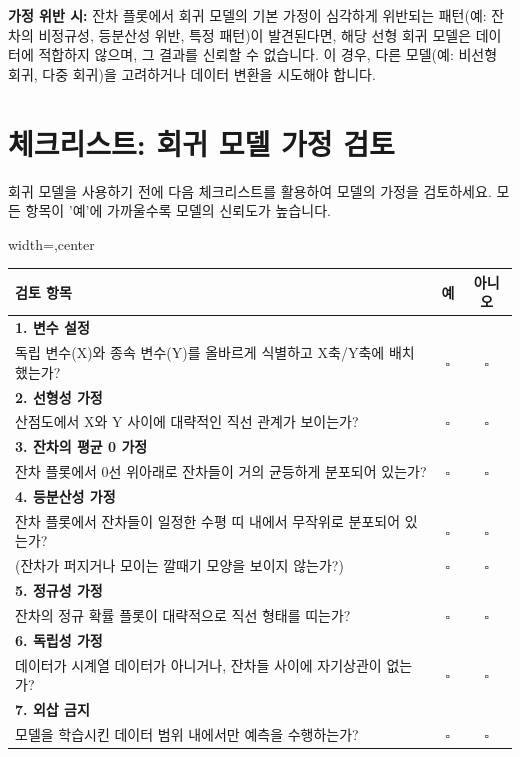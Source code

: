 \documentclass[11pt,a4paper]{article}
\begin{document}
\begin{cautionbox}
\textbf{가정 위반 시:}
잔차 플롯에서 회귀 모델의 기본 가정이 심각하게 위반되는 패턴(예: 잔차의 비정규성, 등분산성 위반, 특정 패턴)이 발견된다면, 해당 선형 회귀 모델은 데이터에 적합하지 않으며, 그 결과를 신뢰할 수 없습니다. 이 경우, 다른 모델(예: 비선형 회귀, 다중 회귀)을 고려하거나 데이터 변환을 시도해야 합니다.
\end{cautionbox}

\newpage
\section*{체크리스트: 회귀 모델 가정 검토}
회귀 모델을 사용하기 전에 다음 체크리스트를 활용하여 모델의 가정을 검토하세요. 모든 항목이 '예'에 가까울수록 모델의 신뢰도가 높습니다.

\begin{adjustbox}{width=\textwidth,center}
\begin{tabular}{p{}cc}
\toprule
\textbf{검토 항목} & \textbf{예} & \textbf{아니오} \\
\midrule
\textbf{1. 변수 설정} & & \\
\quad 독립 변수(X)와 종속 변수(Y)를 올바르게 식별하고 X축/Y축에 배치했는가? & $\square$ & $\square$ \\
\textbf{2. 선형성 가정} & & \\
\quad 산점도에서 X와 Y 사이에 대략적인 직선 관계가 보이는가? & $\square$ & $\square$ \\
\textbf{3. 잔차의 평균 0 가정} & & \\
\quad 잔차 플롯에서 0선 위아래로 잔차들이 거의 균등하게 분포되어 있는가? & $\square$ & $\square$ \\
\textbf{4. 등분산성 가정} & & \\
\quad 잔차 플롯에서 잔차들이 일정한 수평 띠 내에서 무작위로 분포되어 있는가? & $\square$ & $\square$ \\
\quad (잔차가 퍼지거나 모이는 깔때기 모양을 보이지 않는가?) & $\square$ & $\square$ \\
\textbf{5. 정규성 가정} & & \\
\quad 잔차의 정규 확률 플롯이 대략적으로 직선 형태를 띠는가? & $\square$ & $\square$ \\
\textbf{6. 독립성 가정} & & \\
\quad 데이터가 시계열 데이터가 아니거나, 잔차들 사이에 자기상관이 없는가? & $\square$ & $\square$ \\
\textbf{7. 외삽 금지} & & \\
\quad 모델을 학습시킨 데이터 범위 내에서만 예측을 수행하는가? & $\square$ & $\square$ \\
\bottomrule
\end{tabular}
\end{adjustbox}
\end{document}
